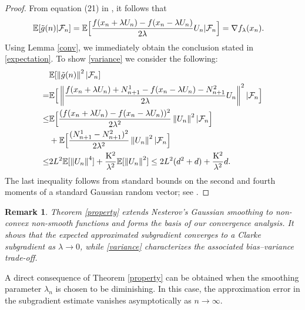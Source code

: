 \documentclass[9pt,journal,twoside,web]{ieeecolor}
\newtheorem{remark}{Remark}
\newcommand{\norm}[1]{\left\lVert #1 \right\rVert}
\begin{document}
\begin{proof}
From equation (21) in \cite{Nesterov2015RandomGM}, it follows that
{\small 
\begin{equation*}
    \begin{split}
        \mathbb{E}[\Tilde{g}(n) | \mathcal{F}_n] & = \mathbb{E}\Big{[}\frac{f(x_n+ \lambda U_n)-f(x_n-\lambda U_n)}{2 \lambda} U_n | \mathcal{F}_n \Big{]} = \nabla f_\lambda (x_n).
    \end{split}
\end{equation*}
}
Using Lemma \ref{conv}, we immediately obtain the conclusion stated in \eqref{expectation}. To show \eqref{variance} we consider the following: 
\begin{equation*}
    \begin{split}
       & \mathbb{E} [\norm{\Tilde{g}(n)}^2 | \mathcal{F}_n]
       \\ = & \mathbb{E} \Big{[} \norm{\frac{f(x_n+ \lambda U_n) + N_{n+1}^1- f(x_n- \lambda U_n) - N_{n+1}^2}{2 \lambda} U_n}^2| \mathcal{F}_n \Big{]}
       \\ \leq & \mathbb{E} \Big{[} \frac{(f(x_n+ \lambda U_n) - f(x_n- \lambda U_n))^2 }{2 \lambda^2} \norm{U_n}^2| \mathcal{F}_n \Big{]}
       \\ & + \mathbb{E} \Big{[}  \frac{ (N_{n+1}^1-   N_{n+1}^2)^2}{2 \lambda^2} \norm{ U_n}^2| \mathcal{F}_n \Big{]}
       \\ \leq  & 2 L^2 \mathbb{E}[\norm{U_n}^4] +  \frac{\mathrm{K}^2}{\lambda^2} \mathbb{E}[\norm{U_n}^2]
        \leq   2 L^2 (d^2 + d)  + \frac{\mathrm{K}^2}{\lambda^2} d.
    \end{split}
\end{equation*}
\color{black}
The last inequality follows from standard bounds on the second and fourth moments of a standard Gaussian random vector; see \cite{Nesterov2015RandomGM}.
\color{black}
\end{proof}
\begin{remark}
Theorem \ref{property} extends Nesterov’s Gaussian smoothing to non-convex non-smooth functions and forms the basis of our convergence analysis. It shows that the expected approximated subgradient converges to a Clarke subgradient as $\lambda \to 0$, while \eqref{variance} characterizes the associated bias--variance trade-off.
\end{remark}
\color{black}
A direct consequence of Theorem \ref{property} can be obtained when the smoothing parameter $\lambda_n$ is chosen to be diminishing. In this case, the approximation error in the subgradient estimate vanishes asymptotically as $n \to \infty$.
\end{document}
